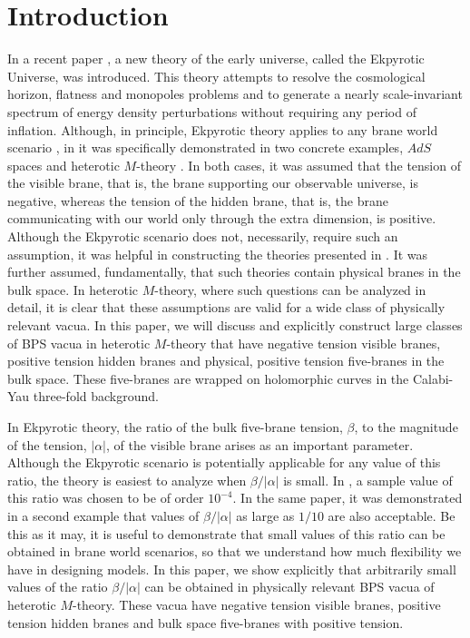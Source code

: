 \documentclass[a4paper,12pt]{article}
\numberwithin{equation}{section}
\theoremstyle{plain}
\begin{document}

\section{Introduction}

In a recent paper \cite{EU}, a new theory of the early universe, called the
Ekpyrotic Universe, was introduced. This theory attempts to resolve the 
cosmological horizon, flatness and monopoles problems and to generate a 
nearly scale-invariant spectrum of energy density perturbations 
without requiring any period of inflation. Although, in principle, 
Ekpyrotic theory applies to any brane world scenario \cite{BW1,BW1B,
BW2,BW3,BW4,BW5,BW6},
in \cite{EU} it was specifically demonstrated in two concrete examples, $AdS$
spaces \cite{BW5} and heterotic $M$-theory \cite{BW1,BW1B,HW}.
In both cases, it was assumed
that the tension of the visible brane, that is, the brane supporting our
observable universe, is negative, whereas the tension of the hidden brane, that
is, the brane communicating with our world only through the extra dimension, 
is positive. Although the 
Ekpyrotic scenario does not, necessarily, require such an assumption, 
it was helpful in constructing the theories presented in \cite{EU}. It was further
assumed, fundamentally, that such theories contain physical branes in the bulk
space. In heterotic $M$-theory, where such questions can be analyzed
in detail, it is clear that these assumptions are valid for a wide class of 
physically relevant vacua. In this paper, we will discuss and explicitly construct
large classes of BPS vacua in heterotic $M$-theory that have negative tension visible
branes, positive tension hidden branes and physical, positive tension 
five-branes in the bulk space. These five-branes are wrapped on holomorphic
curves in the Calabi-Yau three-fold background.

In Ekpyrotic theory, the ratio of the bulk five-brane tension, $\beta$, 
to the magnitude of the tension, $|\alpha|$, of the visible brane arises as an 
important parameter. Although the Ekpyrotic scenario is potentially 
applicable for any value of this ratio, the theory is easiest to analyze when
$\beta/|\alpha|$ is small. In \cite{EU}, a sample value of this ratio was chosen to
be of order $10^{-4}$. In the same paper, it was demonstrated in a second
example that
values of $\beta/|\alpha|$ as large as $1/10$ are also acceptable. Be this as
it may, it is useful to demonstrate that small values of this ratio can be
obtained in brane world scenarios, so that we understand how much 
flexibility we
have in designing models. In this paper, we show explicitly
that arbitrarily small values of the ratio $\beta/|\alpha|$ can be obtained in
physically relevant BPS vacua of heterotic $M$-theory. These vacua have negative
tension visible branes, positive tension hidden branes and bulk space
five-branes with positive tension.
\end{document}
